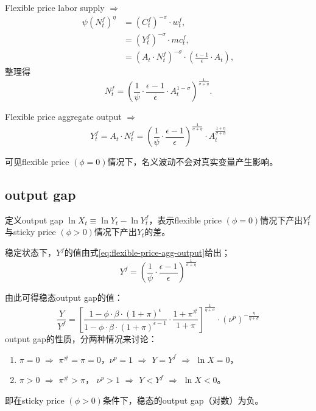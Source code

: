 Flexible price labor supply $\Rightarrow$
\begin{align*}
  \psi (N_t^f)^{\eta} &= (C_t^f)^{-\sigma} \cdot w_t^f,\\
                      &=(Y_t^f)^{-\sigma} \cdot mc_t^f,\\
                      &=\left( A_t \cdot N_t^f \right)^{-\sigma} \cdot \left( \frac{\epsilon -1}{\epsilon} \cdot A_t\right),
\end{align*}
整理得
\begin{equation}
  \label{eq:flexible-price-labor-supply}
  N_t^f = \left(\frac{1}{\psi} \cdot \frac{\epsilon -1}{\epsilon} \cdot A_t^{1-\sigma}\right)^{\frac{1}{\sigma + \eta}}.
\end{equation}

Flexible price aggregate output $\Rightarrow $
\begin{equation}
  \label{eq:flexible-price-agg-output}
  Y_t^f = A_t \cdot N_t^f = \left(\frac{1}{\psi} \cdot \frac{\epsilon -1}{\epsilon}\right)^{\frac{1}{\sigma + \eta}} \cdot  A_t^{\frac{1+\eta}{\sigma + \eta}}
\end{equation}

可见flexible price $(\phi =0)$情况下，名义波动不会对真实变量产生影响。

\subsection{output gap}
\label{sec:output-gap}
定义output gap $\ln X_t \equiv \ln Y_t - \ln Y_t^f$，表示flexible price $(\phi = 0)$情况下产出$Y_t^f$与sticky price $(\phi >0)$情况下产出$Y_t$的差。

稳定状态下，$Y^f$的值由式\eqref{eq:flexible-price-agg-output}给出；
\begin{equation*}
    Y^f = \left(\frac{1}{\psi} \cdot \frac{\epsilon -1}{\epsilon}\right)^{\frac{1}{\sigma + \eta}}
\end{equation*}

由此可得稳态output gap的值：
\begin{equation}
  \label{eq:ss-output-gap}
  \frac{Y}{Y^f} =
  \left[
    \frac{1-\phi \cdot \beta \cdot (1+\pi)^{\epsilon}}{1-\phi \cdot \beta \cdot (1+\pi)^{\epsilon -1}} \cdot \frac{1+\pi^{\#}}{1+\pi}
  \right]^{\frac{1}{\eta + \sigma}} \cdot
  \left(
    \nu^p
  \right)^{- \frac{\eta}{\eta + \sigma}}
\end{equation}
output gap的性质，分两种情况来讨论：

\begin{enumerate}
\item $\pi = 0$ $\Rightarrow$ $\pi^{\#} = \pi = 0$，$\nu^p = 1$ $\Rightarrow$ $Y=Y^f$ $\Rightarrow$ $\ln X = 0$，
\item $\pi >0$ $\Rightarrow$ $\pi^{\#} > \pi$， $\nu^p >1$ $\Rightarrow$ $Y<Y^f$ $\Rightarrow$ $\ln X < 0$。
\end{enumerate}
即在sticky price $(\phi >0)$条件下，稳态的output gap（对数）为负。


